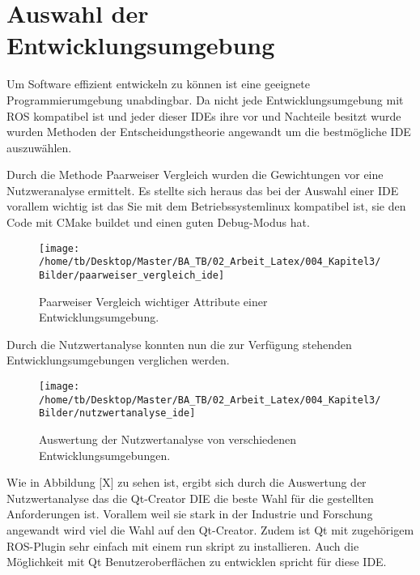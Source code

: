 %

\chapter{Auswahl der Entwicklungsumgebung}
\label{cha:Auswahl der Entwicklungsumgebung} 

Um Software effizient entwickeln zu k{\"o}nnen ist eine geeignete Programmierumgebung unabdingbar. 
Da nicht jede Entwicklungsumgebung mit ROS kompatibel ist und jeder dieser IDEs ihre vor und Nachteile besitzt wurde wurden Methoden der Entscheidungstheorie angewandt um die bestm{\"o}gliche IDE auszuw{\"a}hlen.

Durch die Methode Paarweiser Vergleich wurden die Gewichtungen vor eine Nutzweranalyse ermittelt. Es stellte sich heraus das bei der Auswahl einer IDE vorallem wichtig ist das Sie mit dem Betriebssystemlinux kompatibel ist, sie den Code mit CMake buildet und einen guten Debug-Modus hat.






\begin{figure}[H]
\begin{center}
  \texttt{[image: /home/tb/Desktop/Master/BA\_TB/02\_Arbeit\_Latex/004\_Kapitel3/Bilder/paarweiser\_vergleich\_ide]}%
  \caption[PaarweiserVergleichIDE]%
           {\label{fig:PaarweiserVergleichIDE}%
           Paarweiser Vergleich wichtiger Attribute einer Entwicklungsumgebung.}
\end{center}
\end{figure}

Durch die Nutzwertanalyse konnten nun die zur Verfügung stehenden Entwicklungsumgebungen verglichen werden. 

\begin{figure}[H]
\begin{center}
  \texttt{[image: /home/tb/Desktop/Master/BA\_TB/02\_Arbeit\_Latex/004\_Kapitel3/Bilder/nutzwertanalyse\_ide]}%
  \caption[NutzwertAnalyseIDE]%
           {\label{fig:NutzwertAnalyseIDE}%
           Auswertung der Nutzwertanalyse von verschiedenen Entwicklungsumgebungen.}
\end{center}
\end{figure}


Wie in Abbildung [X] zu sehen ist, ergibt sich durch die Auswertung der Nutzwertanalyse das die Qt-Creator DIE die beste Wahl f{\"u}r die gestellten Anforderungen ist. Vorallem weil sie stark in der Industrie und Forschung angewandt wird viel die Wahl auf den Qt-Creator. Zudem ist Qt mit zugeh{\"o}rigem ROS-Plugin sehr einfach mit einem run skript zu installieren. Auch die M{\"o}glichkeit mit Qt Benutzeroberfl{\"a}chen zu entwicklen spricht für diese IDE.







